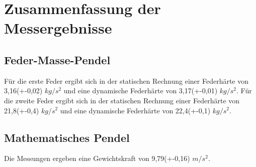 \section{Zusammenfassung der Messergebnisse}
\subsection{Feder-Masse-Pendel}
Für die erste Feder ergibt sich in der statischen Rechnung einer Federhärte von 3,16(+-0,02) $kg/s^{2}$ und eine dynamische Federhärte von 3,17(+-0,01) $kg/s^{2}$.
\newline
\newline
Für die zweite Feder ergibt sich in der statischen Rechnung einer Federhärte von 21,8(+-0,4) $kg/s^{2}$ und eine dynamische Federhärte von 22,4(+-0,1) $kg/s^{2}$.
\subsection{Mathematisches Pendel}
Die Messungen ergeben eine Gewichtskraft von 9,79(+-0,16) $m/s^{2}$.